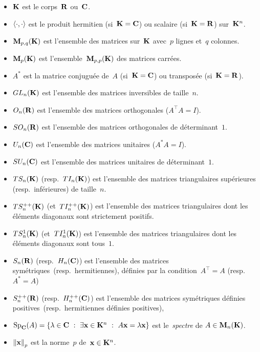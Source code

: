 \begin{itemize}
	\item $\mathbf{K}$ est le corps~$\mathbf{R}$ ou~$\mathbf{C}$.
	\item $\left\langle \cdot,\cdot\right\rangle$ est le produit hermitien
		(si~$\mathbf{K}=\mathbf{C}$) ou scalaire (si~$\mathbf{K}=\mathbf{R}$) sur~$\mathbf{K}^n$.
	\item $\mathbf{M}_{p,q}(\mathbf{K})$ est l'ensemble des matrices sur~$\mathbf{K}$
		avec~$p$ lignes et~$q$ colonnes.
	\item $\mathbf{M}_p(\mathbf{K})$ est l'ensemble~$\mathbf{M}_{p,p}(\mathbf{K})$ des matrices carrées.
	\item $A^*$ est la matrice conjuguée de~$A$ (si~$\mathbf{K}=\mathbf{C}$) ou transposée
		(si~$\mathbf{K}=\mathbf{R}$).
	\item $GL_n(\mathbf{K})$ est
		l'ensemble des matrices inversibles de taille~$n$.
	\item $O_n(\mathbf{R})$ est 
		l'ensemble des matrices orthogonales ($A^\top A=I$).
	\item $SO_n(\mathbf{R})$ est
		l'ensemble des matrices orthogonales de déterminant~$1$.
	\item $U_n(\mathbf{C})$ est
		l'ensemble des matrices unitaires ($A^*A=I$).
	\item $SU_n(\mathbf{C})$ est
		l'ensemble des matrices unitaires de déterminant~$1$.
	\item $TS_n(\mathbf{K})$ (resp.~$TI_n(\mathbf{K})$) est l'ensemble des matrices
		triangulaires supérieures (resp.~inférieures) de taille~$n$.
	\item $TS^{++}_n(\mathbf{K})$ (et~$TI^{++}_n(\mathbf{K})$) est l'ensemble des matrices
		triangulaires dont les éléments diagonaux sont strictement positifs.
	\item $TS^{1}_n(\mathbf{K})$ (et~$TI^{1}_n(\mathbf{K})$) est l'ensemble des matrices
		triangulaires dont les éléments diagonaux sont tous~$1$.
	\item $S_n(\mathbf{R})$ (resp.~$H_n(\mathbf{C})$) est l'ensemble des matrices
			symétriques~(resp.~hermitiennes), définies par la
			condition~$A^\top=A$ (resp.~$A^*=A$)
	\item $S^{++}_n(\mathbf{R})$ (resp.~$H^{++}_n(\mathbf{C})$) est l'ensemble des matrices
			symétriques définies positives~(resp.~hermitiennes définies positives),
		\item $\Sp_\C(A)=\left\{\lambda\in\C\ :\ \exists\x\in\K^n\ :\
			A\x=\lambda\x\right\}$ est le~\emph{spectre} de
			$A\in\mathbf{M}_n(\mathbf{K})$.
	\item $\left\|\mathbf{x}\right\|_p$ est la norme~$p$ de~$\mathbf{x}\in\mathbf{K}^n$.
\end{itemize}

